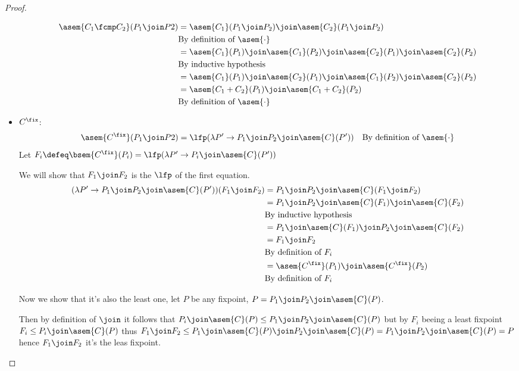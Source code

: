 \begin{proof}
\begin{itemize}
      \begin{align*}
        \asem{C_1 \fcmp C_2}(P_1 \join P2)
          &= \asem{C_1}(P_1 \join P_2) \join \asem{C_2}(P_1 \join P_2) \\
          &\text{By definition of $\asem{\cdot}$} \\
          &= \asem{C_1}(P_1) \join \asem{C_1}(P_2) \join \asem{C_2}(P_1)
            \join \asem{C_2}(P_2) \\
          &\text{By inductive hypothesis} \\
          &= \asem{C_1}(P_1) \join \asem{C_2}(P_1) \join \asem{C_1}(P_2)
            \join \asem{C_2}(P_2) \\
          &= \asem{C_1 + C_2}(P_1) \join \asem{C_1 + C_2}(P_2) \\
          &\text{By definition of $\asem{\cdot}$} \\
      \end{align*}
    \item $C^\fix$:
      \begin{align*}
        \asem{C^\fix}(P_1 \join P2)
          &= \lfp(\lambda P' \to P_1 \join P_2 \join \asem{C}(P'))
          &\text{By definition of $\asem{\cdot}$}
      \end{align*}
      Let $F_i \defeq \bsem{C^\fix}(P_i) = \lfp(\lambda P' \to P_i \join 
      \asem{C}(P'))$

      We will show that $F_1 \join F_2$ is the $\lfp$ of the first equation.
      \begin{align*}
        (\lambda P' \to P_1 \join P_2 \join \asem{C}(P'))(F_1 \join F_2)
          &= P_1 \join P_2 \join \asem{C}(F_1 \join F_2) \\
          &= P_1 \join P_2 \join \asem{C}(F_1) \join \asem{C}(F_2)  \\
          &\text{By inductive hypothesis}\\
          &= P_1 \join \asem{C}(F_1) \join P_2 \join \asem{C}(F_2) \\
          &= F_1 \join F_2 \\
          &\text{By definition of $F_i$}\\
          &= \asem{C^\fix}(P_1) \join \asem{C^\fix}(P_2) \\
          &\text{By definition of $F_i$}\\
      \end{align*}

      Now we show that it's also the least one, let $P$ be any fixpoint, 
      $P = P_1 \join P_2 \join \asem{C}(P)$.
      
      Then by definition of $\join$ it follows that $P_i \join \asem{C}(P) \leq 
      P_1 \join P_2 \join \asem{C}(P)$ but by $F_i$ beeing a least fixpoint
      $F_i \leq P_i \join \asem{C}(P)$ thus $F_1 \join F_2 \leq P_1
      \join \asem{C}(P) \join P_2 \join \asem{C}(P) = P_1 \join P_2 \join 
      \asem{C}(P) = P$ hence $F_1 \join F_2$ it's the leas fixpoint.
  \end{itemize}
\end{proof}

